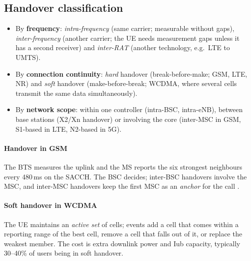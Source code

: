 \documentclass[11pt,a4paper]{article}
\begin{document}
\subsection{Handover classification}
\begin{itemize}
  \item By \textbf{frequency}: \emph{intra-frequency} (same carrier; measurable without gaps),
        \emph{inter-frequency} (another carrier; the UE needs measurement gaps unless it has a
        second receiver) and \emph{inter-RAT} (another technology, e.g.\ LTE to UMTS).
  \item By \textbf{connection continuity}: \emph{hard} handover (break-before-make; GSM, LTE, NR)
        and \emph{soft} handover (make-before-break; WCDMA, where several cells transmit the same
        data simultaneously).
  \item By \textbf{network scope}: within one controller (intra-BSC, intra-eNB), between base
        stations (X2/Xn handover) or involving the core (inter-MSC in GSM, S1-based in LTE, N2-based
        in 5G).
\end{itemize}

\paragraph{Handover in GSM} The BTS measures the uplink and the MS reports the six strongest
neighbours every 480\,ms on the SACCH. The BSC decides; inter-BSC handovers involve the MSC, and
inter-MSC handovers keep the first MSC as an \emph{anchor} for the call \cite{ts23009}.

\paragraph{Soft handover in WCDMA} The UE maintains an \emph{active set} of cells; events add a
cell that comes within a reporting range of the best cell, remove a cell that falls out of it,
or replace the weakest member. The cost is extra downlink power and Iub capacity, typically
30--40\% of users being in soft handover.
\end{document}
